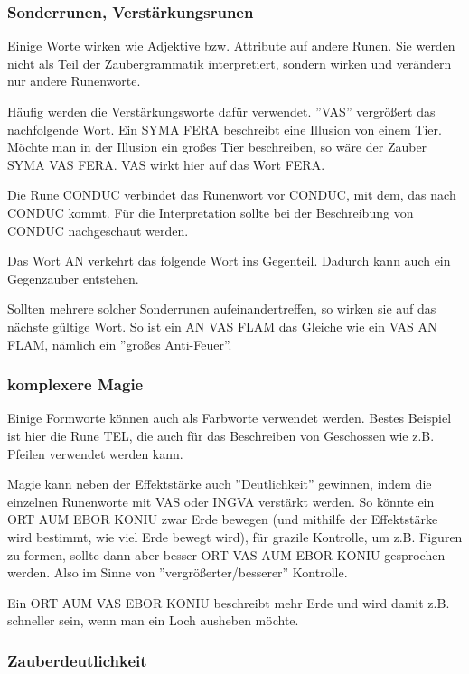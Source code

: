 \documentclass{article}
\begin{document}
\subsubsection{Sonderrunen, Verstärkungsrunen}

Einige Worte wirken wie Adjektive bzw. Attribute auf andere Runen. Sie werden nicht als Teil der Zaubergrammatik
interpretiert, sondern wirken und verändern nur andere Runenworte.

Häufig werden die Verstärkungsworte dafür verwendet. ''VAS'' vergrößert das nachfolgende Wort. Ein SYMA FERA beschreibt
eine Illusion von einem Tier. Möchte man in der Illusion ein großes Tier beschreiben, so wäre der Zauber SYMA VAS FERA.
VAS wirkt hier auf das Wort FERA.

Die Rune CONDUC verbindet das Runenwort vor CONDUC, mit dem, das nach CONDUC kommt. Für die Interpretation sollte bei
der Beschreibung von CONDUC nachgeschaut werden.

Das Wort AN verkehrt das folgende Wort ins Gegenteil. Dadurch kann auch ein Gegenzauber entstehen.

Sollten mehrere solcher Sonderrunen aufeinandertreffen, so wirken sie auf das nächste gültige Wort. So ist ein
AN VAS FLAM das Gleiche wie ein VAS AN FLAM, nämlich ein ''großes Anti-Feuer''.

\subsubsection{komplexere Magie}

Einige Formworte können auch als Farbworte verwendet werden. Bestes Beispiel ist hier die Rune TEL, die auch für das
Beschreiben von Geschossen wie z.B. Pfeilen verwendet werden kann.

Magie kann neben der Effektstärke auch ''Deutlichkeit'' gewinnen, indem die einzelnen Runenworte mit VAS oder INGVA verstärkt
werden. So könnte ein ORT AUM EBOR KONIU zwar Erde bewegen (und mithilfe der Effektstärke wird bestimmt, wie viel Erde
bewegt wird), für grazile Kontrolle, um z.B. Figuren zu formen, sollte dann aber besser ORT VAS AUM EBOR KONIU gesprochen
werden. Also im Sinne von ''vergrößerter/besserer'' Kontrolle.

Ein ORT AUM VAS EBOR KONIU beschreibt mehr Erde und wird damit z.B. schneller sein, wenn man ein Loch ausheben möchte.

\subsubsection{Zauberdeutlichkeit}
\end{document}
